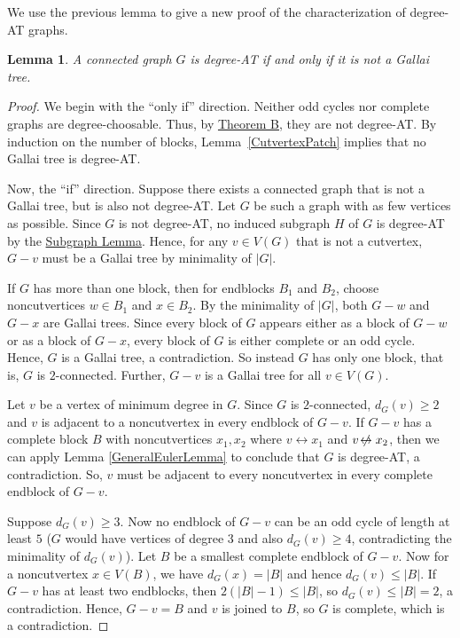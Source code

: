 \documentclass[12pt]{article}
\theoremstyle{plain}
\newtheorem{lem}[thm]{Lemma}
\theoremstyle{definition}
\theoremstyle{remark}
\newcommand{\set}[1]{\left\{ #1 \right\}}
\def\adj{\leftrightarrow}
\def\nonadj{\not\!\leftrightarrow}
\begin{document}
	We use the previous lemma to give a new proof of the characterization of
	degree-AT graphs.
	\begin{lem}
		\label{DegreeATClassification}
		A connected graph $G$ is degree-AT if and only if it is not a Gallai tree.
	\end{lem}
	\begin{proof}
		We begin with the ``only if'' direction.  Neither odd cycles nor complete graphs
		are degree-choosable.  Thus, by \hyperlink{target:thmB}{Theorem B}, they are not
		degree-AT.  By induction on the number of blocks, Lemma~\ref{CutvertexPatch}
		implies that no Gallai tree is degree-AT.
		
		Now, the ``if'' direction.
		Suppose there exists a connected graph that is not a Gallai tree, but is also not
		degree-AT.  Let $G$ be such a graph with as few vertices as possible.
		Since $G$ is not degree-AT, no induced subgraph $H$ of $G$ is
		degree-AT by the \hyperlink{target:InducedSubgraph}{Subgraph Lemma}. 
		Hence, for any $v \in V(G)$ that is not a cutvertex, $G-v$ must be a Gallai
		tree by minimality of $|G|$.  
		
		If $G$ has more than one block, then for endblocks $B_1$ and $B_2$, choose
		noncutvertices $w\in B_1$ and $x\in B_2$.  By the minimality of $|G|$, both
		$G-w$ and $G-x$ are Gallai trees.  Since every block of $G$ appears either as a
		block of $G-w$ or as a block of $G-x$, every block of $G$ is either complete or
		an odd cycle.  Hence, $G$ is a Gallai tree, a contradiction.  So instead $G$
		has only one block, that is, $G$ is $2$-connected.  Further, $G-v$ is a Gallai
		tree for all $v \in V(G)$.
		
		Let $v$ be a vertex of minimum degree in $G$.  Since $G$ is $2$-connected,
		$d_G(v) \ge 2$ and $v$ is adjacent to a noncutvertex in every endblock of $G-v$.
		If $G-v$ has a complete block $B$ with noncutvertices $x_1,x_2$ where $v \adj
		x_1$ and $v \nonadj x_2$, then we can apply Lemma \ref{GeneralEulerLemma} 
		to conclude that $G$ is degree-AT, a
		contradiction.  So, $v$ must be adjacent to every noncutvertex in every
		complete endblock of $G-v$.
		
		Suppose $d_G(v) \ge 3$.  Now no endblock of $G-v$ can be an odd cycle of
		length at least $5$ ($G$ would have vertices of degree $3$ and also $d_G(v) \ge
		4$, contradicting the minimality of $d_G(v)$).  Let $B$ be a smallest complete
		endblock of $G-v$.  Now for a noncutvertex $x \in V(B)$, we have $d_G(x) =
		|B|$ and hence $d_G(v) \le |B|$. 
		If $G-v$ has at least two endblocks, then $2(|B|-1) \le |B|$, so $d_G(v)
		\le |B| = 2$, a contradiction.  Hence, $G-v = B$ and $v$ is joined to $B$, so
		$G$ is complete, which is a contradiction.
		

\end{proof}
\end{document}
